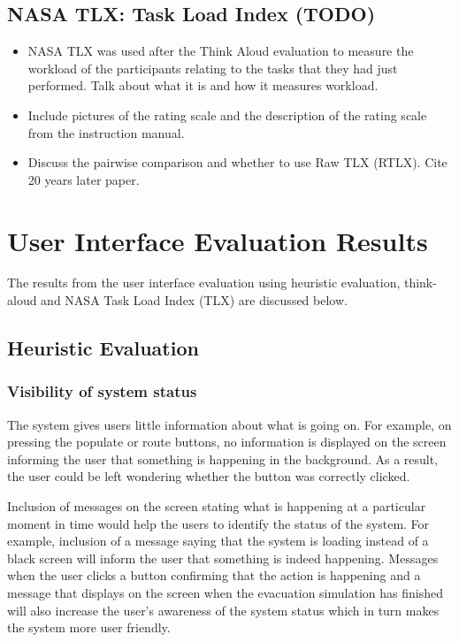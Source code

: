 \documentclass{article}
\begin{document}
\subsection{NASA TLX: Task Load Index (TODO)}
\begin{itemize}
\item NASA TLX was used after the Think Aloud evaluation to measure the workload of the participants relating to the tasks that they had just performed. Talk about what it is and how it measures workload.
\item Include pictures of the rating scale and the description of the rating scale from the instruction manual.
\item Discuss the pairwise comparison and whether to use Raw TLX (RTLX). Cite 20 years later paper.
\end{itemize}

\section{User Interface Evaluation Results}
\label{results}

The results from the user interface evaluation using heuristic evaluation, think-aloud and NASA Task Load Index (TLX) are discussed below.

\subsection{Heuristic Evaluation}
\subsubsection{Visibility of system status}
The system gives users little information about what is going on. For example, on pressing the populate or route buttons, no information is displayed on the screen informing the user that something is happening in the background. As a result, the user could be left wondering whether the button was correctly clicked.

Inclusion of messages on the screen stating what is happening at a particular moment in time would help the users to identify the status of the system. For example, inclusion of a message saying that the system is loading instead of a black screen will inform the user that something is indeed happening. Messages when the user clicks a button confirming that the action is happening and a message that displays on the screen when the evacuation simulation has finished will also increase the user’s awareness of the system status which in turn makes the system more user friendly.
\end{document}
